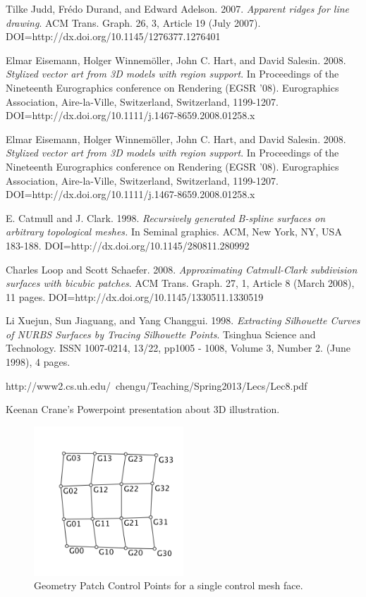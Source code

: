 \documentclass[12pt, letterpaper]{article}
\begin{document}
\begin{thebibliography}{9}

Tilke Judd, Frédo Durand, and Edward Adelson. 2007. 
\emph{Apparent ridges for line drawing}. ACM Trans. Graph. 26, 3, Article 19 (July 2007). DOI=http://dx.doi.org/10.1145/1276377.1276401

Elmar Eisemann, Holger Winnemöller, John C. Hart, and David Salesin. 2008.
\emph{Stylized vector art from 3D models with region support}. In Proceedings of the Nineteenth Eurographics conference on Rendering (EGSR '08). Eurographics Association, Aire-la-Ville, Switzerland, Switzerland, 1199-1207. DOI=http://dx.doi.org/10.1111/j.1467-8659.2008.01258.x

Elmar Eisemann, Holger Winnemöller, John C. Hart, and David Salesin. 2008.
\emph{Stylized vector art from 3D models with region support}. In Proceedings of the Nineteenth Eurographics conference on Rendering (EGSR '08). Eurographics Association, Aire-la-Ville, Switzerland, Switzerland, 1199-1207. DOI=http://dx.doi.org/10.1111/j.1467-8659.2008.01258.x

E. Catmull and J. Clark. 1998. \emph{Recursively generated B-spline surfaces on arbitrary topological meshes.}
In Seminal graphics. ACM, New York, NY, USA 183-188. DOI=http://dx.doi.org/10.1145/280811.280992

Charles Loop and Scott Schaefer. 2008.
\emph{Approximating Catmull-Clark subdivision surfaces with bicubic patches}.
ACM Trans. Graph. 27, 1, Article 8 (March 2008), 11 pages. DOI=http://dx.doi.org/10.1145/1330511.1330519

Li Xuejun, Sun Jiaguang, and Yang Changgui. 1998.
\emph{Extracting Silhouette Curves of NURBS Surfaces by Tracing Silhouette Points}.
Tsinghua Science and Technology. ISSN 1007-0214, 13/22, pp1005 - 1008, Volume 3, Number 2. (June 1998), 4 pages.


http://www2.cs.uh.edu/~chengu/Teaching/Spring2013/Lecs/Lec8.pdf

Keenan Crane's Powerpoint presentation about 3D illustration.

\end{thebibliography}

\newpage

		\begin{figure}[h]
		\centering
		\includegraphics[width=0.5\textwidth]{GeometryPatchControlPoints}
		\caption{Geometry Patch Control Points for a single control mesh face.}
		\label{fig:G}
		\end{figure}
		
\end{document}
